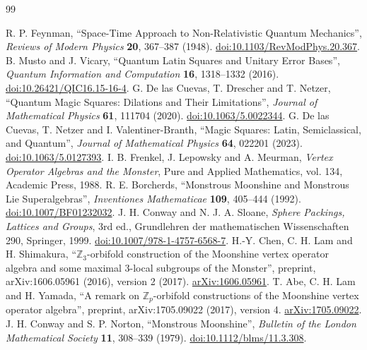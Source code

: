 \begin{thebibliography}{99}
\fontsize{9}{10.8}\selectfont
\setlength{\itemsep}{2.5pt}
\setlength{\parskip}{0pt}
\raggedright
{}
{}
 R. P. Feynman, ``Space-Time Approach to Non-Relativistic Quantum Mechanics'', \emph{Reviews of Modern Physics} \textbf{20}, 367--387 (1948). \href{https://doi.org/10.1103/RevModPhys.20.367}{doi:10.1103/RevModPhys.20.367}.
 B. Musto and J. Vicary, ``Quantum Latin Squares and Unitary Error Bases'', \emph{Quantum Information and Computation} \textbf{16}, 1318--1332 (2016). \href{https://doi.org/10.26421/QIC16.15-16-4}{doi:10.26421/QIC16.15-16-4}.
 G. De las Cuevas, T. Drescher and T. Netzer, ``Quantum Magic Squares: Dilations and Their Limitations'', \emph{Journal of Mathematical Physics} \textbf{61}, 111704 (2020). \href{https://doi.org/10.1063/5.0022344}{doi:10.1063/5.0022344}.
 G. De las Cuevas, T. Netzer and I. Valentiner-Branth, ``Magic Squares: Latin, Semiclassical, and Quantum'', \emph{Journal of Mathematical Physics} \textbf{64}, 022201 (2023). \href{https://doi.org/10.1063/5.0127393}{doi:10.1063/5.0127393}.
 I. B. Frenkel, J. Lepowsky and A. Meurman, \emph{Vertex Operator Algebras and the Monster}, Pure and Applied Mathematics, vol. 134, Academic Press, 1988.
 R. E. Borcherds, ``Monstrous Moonshine and Monstrous Lie Superalgebras'', \emph{Inventiones Mathematicae} \textbf{109}, 405--444 (1992). \href{https://doi.org/10.1007/BF01232032}{doi:10.1007/BF01232032}.
 J. H. Conway and N. J. A. Sloane, \emph{Sphere Packings, Lattices and Groups}, 3rd ed., Grundlehren der mathematischen Wissenschaften 290, Springer, 1999. \href{https://doi.org/10.1007/978-1-4757-6568-7}{doi:10.1007/978-1-4757-6568-7}.
 H.-Y. Chen, C. H. Lam and H. Shimakura, ``\(\mathbb Z_3\)-orbifold construction of the Moonshine vertex operator algebra and some maximal \(3\)-local subgroups of the Monster'', preprint, arXiv:1606.05961 (2016), version 2 (2017). \href{https://arxiv.org/abs/1606.05961}{arXiv:1606.05961}.
 T. Abe, C. H. Lam and H. Yamada, ``A remark on \(\mathbb Z_p\)-orbifold constructions of the Moonshine vertex operator algebra'', preprint, arXiv:1705.09022 (2017), version 4. \href{https://arxiv.org/abs/1705.09022v4}{arXiv:1705.09022}.
 J. H. Conway and S. P. Norton, ``Monstrous Moonshine'', \emph{Bulletin of the London Mathematical Society} \textbf{11}, 308--339 (1979). \href{https://doi.org/10.1112/blms/11.3.308}{doi:10.1112/blms/11.3.308}.

\end{thebibliography}
